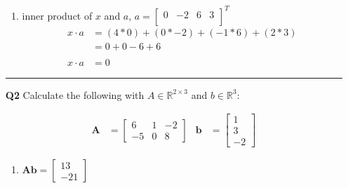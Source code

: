 \documentclass[letterpaper,12pt]{article}
\begin{document}
\begin{itemize}
\begin{enumerate}
            \item inner product of $x$ and $a$, $a = \begin{bmatrix}
                                                        0 & -2 & 6 & 3 \\
                                                        \end{bmatrix}^{T}$
                \[ \begin{split}
                    x \cdot a & = (4 * 0) + (0 * -2) + (-1 * 6) + (2 * 3) \\
                    & = 0 + 0 - 6 + 6 \\ \\
                    x \cdot a & = 0
                   \end{split}
                \]
        \end{enumerate}

        \vspace{2mm}
        \hrule
        \vspace{2mm}

    \item[\textbf{Q2}] Calculate the following with $A \in \mathbb{R}^{2 \times 3}$ and $b \in \mathbb{R}^{3}$:

        \begin{align*}
            \mathbf{A} &= \begin{bmatrix}
                6 & 1 & -2 \\
                -5 & 0 & 8    
            \end{bmatrix} & \mathbf{b} &= \begin{bmatrix} 1 \\ 3 \\ -2 \end{bmatrix}
        \end{align*}


        \begin{enumerate}
            \item $\mathbf{Ab} = \begin{bmatrix}
                13 \\
                -21
            \end{bmatrix}$


\end{enumerate}
\end{itemize}
\end{document}
